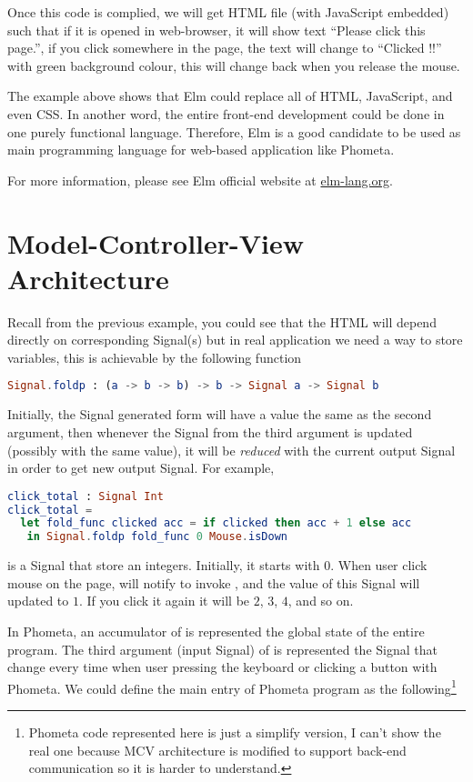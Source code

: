 \documentclass[master.tex]{subfiles}
\begin{document}
Once this code is complied, we will get HTML file (with JavaScript embedded)
such that if it is opened in web-browser, it will show text ``Please click this
page.'', if you click somewhere in the page, the text will change to ``Clicked
!!'' with green background colour, this will change back when you release the
mouse.

The example above shows that Elm could replace all of HTML, JavaScript, and even
CSS. In another word, the entire front-end development could be done in one
purely functional language. Therefore, Elm is a good candidate to be used as
main programming language for web-based application like Phometa.

For more information, please see Elm official website at \url{elm-lang.org}.

\section{Model-Controller-View Architecture}

Recall from the previous example, you could see that the HTML will depend
directly on corresponding Signal(s) but in real application we need a way to
store variables, this is achievable by the following function

\begin{lstlisting}[language=elm]
Signal.foldp : (a -> b -> b) -> b -> Signal a -> Signal b
\end{lstlisting}

Initially, the Signal generated form  will have a value the
same as the second argument, then whenever the Signal from the third argument is
updated (possibly with the same value), it will be \emph{reduced} with the
current output Signal in order to get new output Signal. For example,

\begin{lstlisting}[language=elm]
click_total : Signal Int
click_total =
  let fold_func clicked acc = if clicked then acc + 1 else acc
   in Signal.foldp fold_func 0 Mouse.isDown
\end{lstlisting}

 is a Signal that store an integers. Initially, it starts
with $0$. When user click mouse on the page,  will notify
 to invoke , and the value of this Signal
will updated to $1$. If you click it again it will be $2$, $3$, $4$, and so on.

In Phometa, an accumulator of  is  represented
the global state of the entire program. The third argument (input Signal) of
 is  represented the Signal that change every
time when user pressing the keyboard or clicking a button with Phometa. We could
define the main entry of Phometa program as the following\footnote{Phometa code
  represented here is just a simplify version, I can't show the real one because
  MCV architecture is modified to support back-end communication so it is harder
  to understand.}
\end{document}
